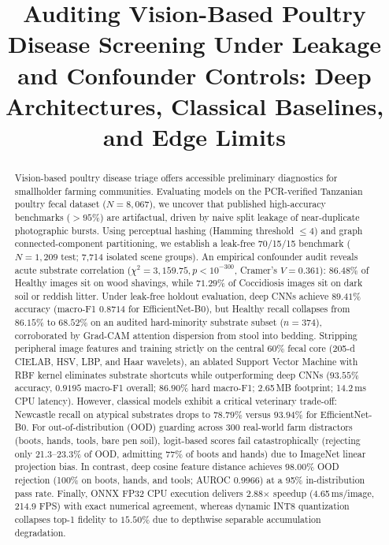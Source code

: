 \documentclass[conference]{IEEEtran}
\begin{document}
\title{Auditing Vision-Based Poultry Disease Screening Under Leakage and Confounder Controls: Deep Architectures, Classical Baselines, and Edge Limits}

\author{
}

\maketitle

\begin{abstract}
Vision-based poultry disease triage offers accessible preliminary diagnostics for smallholder farming communities. Evaluating models on the PCR-verified Tanzanian poultry fecal dataset ($N=8{,}067$), we uncover that published high-accuracy benchmarks ($>95\%$) are artifactual, driven by naive split leakage of near-duplicate photographic bursts. Using perceptual hashing (Hamming threshold $\le 4$) and graph connected-component partitioning, we establish a leak-free 70/15/15 benchmark ($N=1{,}209$ test; 7,714 isolated scene groups). An empirical confounder audit reveals acute substrate correlation ($\chi^2 = 3{,}159.75, p < 10^{-300}$, Cramer's $V = 0.361$): $86.48\%$ of Healthy images sit on wood shavings, while $71.29\%$ of Coccidiosis images sit on dark soil or reddish litter. Under leak-free holdout evaluation, deep CNNs achieve $89.41\%$ accuracy (macro-F1 $0.8714$ for EfficientNet-B0), but Healthy recall collapses from $86.15\%$ to $68.52\%$ on an audited hard-minority substrate subset ($n=374$), corroborated by Grad-CAM attention dispersion from stool into bedding. Stripping peripheral image features and training strictly on the central 60\% fecal core (205-d CIELAB, HSV, LBP, and Haar wavelets), an ablated Support Vector Machine with RBF kernel eliminates substrate shortcuts while outperforming deep CNNs ($93.55\%$ accuracy, $0.9195$ macro-F1 overall; $86.90\%$ hard macro-F1; 2.65\,MB footprint; 14.2\,ms CPU latency). However, classical models exhibit a critical veterinary trade-off: Newcastle recall on atypical substrates drops to $78.79\%$ versus $93.94\%$ for EfficientNet-B0. For out-of-distribution (OOD) guarding across 300 real-world farm distractors (boots, hands, tools, bare pen soil), logit-based scores fail catastrophically (rejecting only 21.3--23.3\% of OOD, admitting $77\%$ of boots and hands) due to ImageNet linear projection bias. In contrast, deep cosine feature distance achieves $98.00\%$ OOD rejection (100\% on boots, hands, and tools; AUROC 0.9966) at a 95\% in-distribution pass rate. Finally, ONNX FP32 CPU execution delivers 2.88$\times$ speedup (4.65\,ms/image, 214.9 FPS) with exact numerical agreement, whereas dynamic INT8 quantization collapses top-1 fidelity to $15.50\%$ due to depthwise separable accumulation degradation.
\end{abstract}
\end{document}
